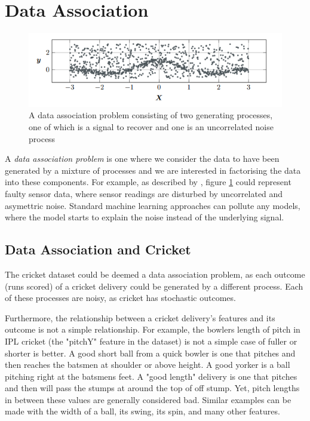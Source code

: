 \documentclass[12pt,a4paper]{report}
\theoremstyle{definition}
\begin{document}
\section{Data Association}

\begin{figure}[H]
    \centering
    \includegraphics[width=\linewidth]{data_association_problem.png}
    \caption{A data association problem consisting of two generating processes, one of which is a signal to recover and one is an uncorrelated noise process \citep{Kaiser2018}}
    \label{fig:DataAssocProblem}
\end{figure}

A \emph{data association problem} is one where we consider the data to have been generated by a mixture of processes and we are interested in factorising the data into these components. 
For example, as described by \citet{Kaiser2018}, figure \ref{fig:DataAssocProblem} could represent faulty sensor data, where sensor readings are disturbed by uncorrelated and asymettric noise. 
Standard machine learning approaches can pollute any models, where the model starts to explain the noise instead of the underlying signal. 

\subsection{Data Association and Cricket}

The cricket dataset could be deemed a data association problem, as each outcome (runs scored) of a cricket delivery could be generated by a different process. 
Each of these processes are noisy, as cricket has stochastic outcomes. 

Furthermore, the relationship between a cricket delivery's features and its outcome is not a simple relationship. 
For example, the bowlers length of pitch in IPL cricket (the "pitchY" feature in the dataset) is not a simple case of fuller or shorter is better.
A good short ball from a quick bowler is one that pitches and then reaches the batsmen at shoulder or above height. 
A good yorker is a ball pitching right at the batsmens feet.
A "good length" delivery is one that pitches and then will pass the stumps at around the top of off stump.
Yet, pitch lengths in between these values are generally considered bad. 
Similar examples can be made with the width of a ball, its swing, its spin, and many other features.
\end{document}
